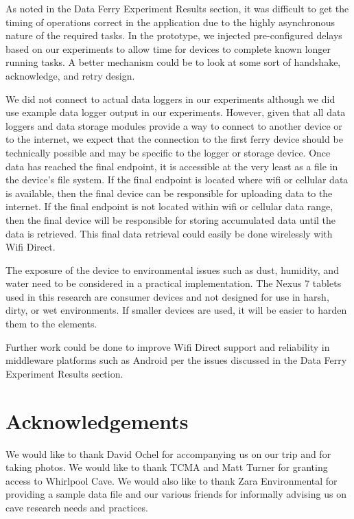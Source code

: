 \documentclass[10pt,twocolumn]{article}
\begin{document}
As noted in the Data Ferry Experiment Results section, it was difficult to get the timing of operations correct in the application due to the highly asynchronous nature of the required tasks.
In the prototype, we injected pre-configured delays based on our experiments to allow time for devices to complete known longer running tasks.
A better mechanism could be to look at some sort of handshake, acknowledge, and retry design.

We did not connect to actual data loggers in our experiments although we did use example data logger output in our experiments.
However, given that all data loggers and data storage modules provide a way to connect to another device or to the internet, 
we expect that the connection to the first ferry device should be technically possible and may be specific to the logger or storage device.
Once data has reached the final endpoint, it is accessible at the very least as a file in the device's file system.
If the final endpoint is located where wifi or cellular data is available, 
then the final device can be responsible for uploading data to the internet.
If the final endpoint is not located within wifi or cellular data range, 
then the final device will be responsible for storing accumulated data until the data is retrieved.
This final data retrieval could easily be done wirelessly with Wifi Direct.

The exposure of the device to environmental issues such as dust, humidity, and water need to be considered in a practical implementation.
The Nexus 7 tablets used in this research are consumer devices and not designed for use in harsh, dirty, or wet environments.
If smaller devices are used, it will be easier to harden them to the elements.

Further work could be done to improve Wifi Direct support and reliability in middleware platforms such as Android per the issues discussed in the Data Ferry Experiment Results section.

\section{Acknowledgements}
We would like to thank David Ochel for accompanying us on our trip and for taking photos. 
We would like to thank TCMA and Matt Turner for granting access to Whirlpool Cave. 
We would also like to thank Zara Environmental for providing a sample data file
and our various friends for informally advising us on cave research needs and practices.

% 



\end{document}
